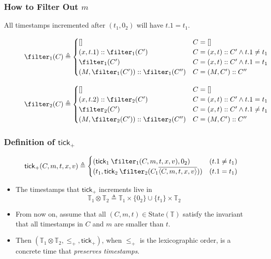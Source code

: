 \documentclass{beamer}
\newcommand*{\cons}{::}
\newcommand*{\Time}{\mathbb{T}}
\newcommand*{\mem}{m}
\newcommand*{\State}[1]{\text{State}({#1})}
\newcommand*{\tick}{\mathsf{tick}}
\newcommand*{\delete}[2]{{#1}\overline{\langle{#2}\rangle}}
\begin{document}
\begin{frame}[c]
  \frametitle{How to Filter Out $\mem$}
  All timestamps incremented after $(t_1,0_2)$ will have $t.1=t_1$.
  \begin{figure}[h!]
    \footnotesize
    \[
      \filter_1(C)\triangleq
      \begin{cases}
        []                                   & C=[]                              \\
        (x,t.1)\cons\filter_1(C')            & C=(x,t)\cons C'\wedge t.1\neq t_1 \\
        \filter_1(C')                        & C=(x,t)\cons C'\wedge t.1=t_1     \\
        (M,\filter_1(C'))\cons\filter_1(C'') & C=(M, C')\cons C''
      \end{cases}
    \]

    \[
      \filter_2(C)\triangleq
      \begin{cases}
        []                                   & C=[]                              \\
        (x,t.2)\cons\filter_2(C')            & C=(x,t)\cons C'\wedge t.1=t_1     \\
        \filter_2(C')                        & C=(x,t)\cons C'\wedge t.1\neq t_1 \\
        (M,\filter_2(C'))\cons\filter_2(C'') & C=(M, C')\cons C''
      \end{cases}
    \]
  \end{figure}
\end{frame}
\begin{frame}[c]
  \frametitle{Definition of $\tick_+$}
  \begin{figure}[h!]
    \footnotesize
    \[
      \tick_{+}({C},\mem,{t},x,{v})\triangleq
      \begin{cases}
        (\tick_1\:\filter_1(C,\mem,t,x,v), 0_2)                   & (t.1\neq t_1) \\
        (t_1,\tick_2\:\filter_2(\delete{C_1}{C,\mem, {t},x,{v}})) & (t.1=t_1)
      \end{cases}
    \]
  \end{figure}
  \begin{itemize}
    \item The timestamps that $\tick_+$ increments live in
          \[\Time_1\otimes\Time_2\triangleq\Time_1\times\{0_2\}\cup\{t_1\}\times\Time_2\]
    \item From now on, assume that all $(C,\mem,t)\in\State{\Time}$ satisfy the invariant that all timestamps in $C$ and $\mem$ are smaller than $t$.
    \item Then $(\Time_1\otimes\Time_2,\le_+,\tick_+)$, when $\le_+$ is the lexicographic order, is a concrete time that \emph{preserves timestamps}.
  \end{itemize}
\end{frame}
\end{document}
